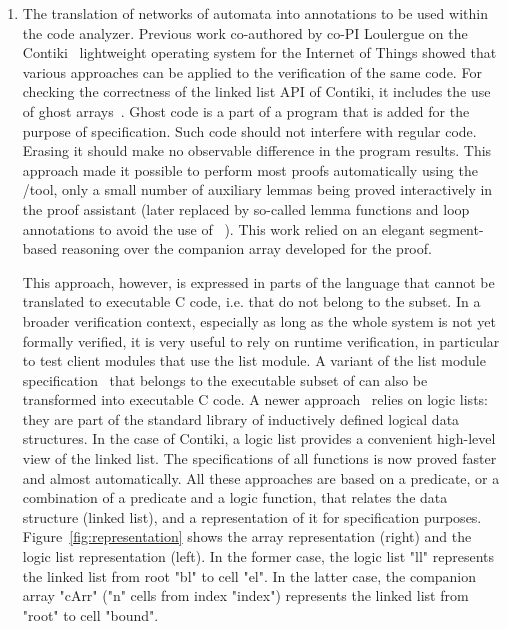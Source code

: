 \begin{enumerate}[labelsep=3pt,leftmargin=12pt]
\item The translation of networks of automata into annotations to be used within the \framac code analyzer.
  Previous work co-authored by  co-PI Loulergue on the Contiki~\cite{DGV2004:LCN} lightweight operating system for the Internet of Things showed that various   approaches can be applied to the verification of the same code.
  For checking the correctness of the linked list API of Contiki, it includes the use of ghost arrays~\cite{BKL2018:NFM}.
  Ghost code is a part of a program that is added for the purpose of specification.
  Such code should not interfere with regular code.
  Erasing it should make no observable difference in the program results.
  This approach made it possible to perform most proofs automatically using the \framac/\Wp tool, only a small number of auxiliary lemmas being proved interactively in the \Coq proof assistant
  (later replaced by so-called lemma functions and loop annotations to avoid the use of \Coq~\cite{BLK2019:NFM}).
  This work relied on an elegant segment-based reasoning over the companion array developed for the proof.
  
  This approach, however, is expressed in parts of the \acsl language that cannot be translated to executable C code, i.e. that do not belong to the \eacsl subset.
  In a broader verification context, especially as long as the whole system is not yet formally verified, it is very useful to rely on runtime verification, in particular to test client modules that use the list module.
  A variant of the list module specification~\cite{LBK2018:TAP}  that belongs to the executable subset \eacsl of \acsl can also  be transformed into executable C code.
  A newer approach~\cite{BKL2019:SAC} relies on logic lists: they are part of the \acsl standard library of inductively defined logical data structures.
  In the case of Contiki, a logic list provides a convenient high-level view of the linked list.
  The specifications of all functions is now proved faster and almost automatically.
  All these approaches are based on a predicate, or a combination of a predicate and a logic function, that relates the data structure (linked list), and a representation of it for specification purposes.
  Figure~\ref{fig:representation} shows the array representation (right) and the logic list representation (left).
  In the former case, the logic list "ll" represents the linked list from root "bl" to cell "el".
  In the latter case, the companion array "cArr" ("n" cells from index "index") represents the linked list from "root" to cell "bound".



\end{enumerate}
